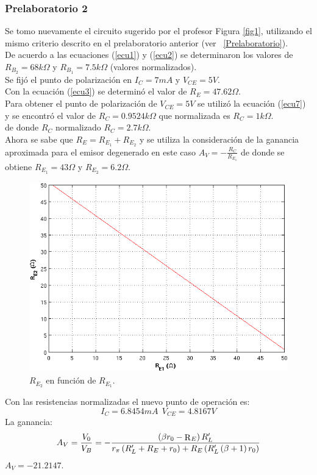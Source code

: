 \documentclass[11pt,graphicx,caption,rotating]{article}
\begin{document}
\subsubsection{Prelaboratorio 2}\label{Prelaboraotiro_2}
\noindent
Se tomo nuevamente el circuito sugerido por el profesor Figura \ref{fig1}, utilizando el mismo criterio descrito en el prelaboratorio anterior (ver  ~\ref{Prelaboratorio}).\\
De acuerdo a las ecuaciones (\ref{ecu1}) y (\ref{ecu2}) se determinaron los valores de $R_{B_2} = 68 k\Omega$ y $R_{B_1} = 7.5 k\Omega$ (valores normalizados).\\
Se fijó el punto de polarización en $I_C= 7 mA$ y $V_{CE}= 5V$.\\
Con la ecuación (\ref{ecu3}) se determinó el valor de $R_E = 47.62 \Omega$.\\
Para obtener el punto de polarización de $V_{CE} = 5 V$ se utilizó la ecuación (\ref{ecu7}) y se encontró el valor de $R_C = 0.9524 k\Omega$ que normalizada es $R_C = 1 k\Omega$.\\
de donde $R_C$ normalizado $R_C= 2.7 k\Omega$.\\
Ahora se sabe que $R_E = R_{E_1} +R_{E_2}$ y se utiliza la consideración de la ganancia aproximada para el emisor degenerado en este caso  $A_V= -\frac{R_C}{R_{E_1}}$   de donde se obtiene $R_{E_1}=43 \Omega$ y $R_{E_2} = 6.2 \Omega$.
\begin{figure}[H]
	\centering
		\includegraphics[scale=0.65]{resultado_re2.png}
	\caption{$R_{E_2}$ en función de $R_{E_1}$.}
	\label{fig6}
\end{figure}
\noindent
Con las resistencias normalizadas el nuevo punto de operación es:
$$ I_C= 6.8454 mA\ \ V_{CE}= 4.8167 V$$
\noindent
La ganancia:
\begin{equation}
 A_V  = \frac{{V_0 }}{{V_B }} =  - \frac{{\left( {\beta r_0  - {\mathop{\rm R}\nolimits} _E } \right)R'_L }}{{r_\pi  \left( {R'_L  + R_E  + r_0 } \right) + R_E \left( {R'_L \left( {\beta  + 1} \right)r_0 } \right)}}
\label{ecu10}
\end{equation}
\noindent
$A_V=-21.2147$.
\end{document}
